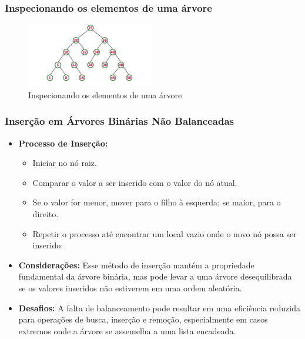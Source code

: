 \begin{frame}[fragile]
  \frametitle{Inspecionando os elementos de uma árvore}
  \begin{figure}
    \centering
    \includegraphics[width=0.5\textwidth]{assets/aula5-arvores4.png}
    \caption{Inspecionando os elementos de uma árvore}
  \end{figure}
\end{frame}
\begin{frame}[fragile]
  \frametitle{Inserção em Árvores Binárias Não Balanceadas}
  \begin{itemize}
    \item \textbf{Processo de Inserção:}
      \begin{itemize}
        \item Iniciar no nó raiz.
        \item Comparar o valor a ser inserido com o valor do nó atual.
        \item Se o valor for menor, mover para o filho à esquerda; se maior, para o direito.
        \item Repetir o processo até encontrar um local vazio onde o novo nó possa ser inserido.
      \end{itemize}
    \item \textbf{Considerações:} Esse método de inserção mantém a propriedade fundamental da árvore binária, mas pode levar a uma árvore desequilibrada se os valores inseridos não estiverem em uma ordem aleatória.
    \item \textbf{Desafios:} A falta de balanceamento pode resultar em uma eficiência reduzida para operações de busca, inserção e remoção, especialmente em casos extremos onde a árvore se assemelha a uma lista encadeada.
  \end{itemize}
\end{frame}

